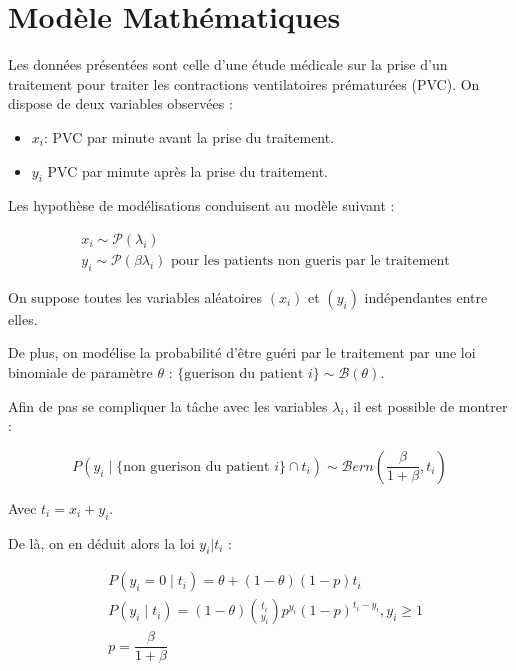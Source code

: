 \section{Modèle Mathématiques}

Les données présentées sont celle d'une étude médicale sur la prise d'un traitement pour traiter les contractions ventilatoires prématurées (PVC).
On dispose de deux variables observées : 
\begin{itemize}
    \item $x_i$: PVC par minute avant la prise du traitement.
    \item $y_i$ PVC par minute après la prise du traitement.
\end{itemize}

Les hypothèse de modélisations conduisent au modèle suivant : 

\begin{equation} \label{eq1}
\begin{split}
    & x_i \sim \mathcal P (\lambda_i) \\
    & y_i \sim \mathcal P (\beta \lambda_i) \text{ pour les patients non gueris par le traitement}
\end{split}
\end{equation}

On suppose toutes les variables aléatoires $(x_i)$ et $(y_i)$ indépendantes entre elles.

De plus, on modélise la probabilité d'être guéri par le traitement par une loi binomiale de paramètre $\theta$ : $\{\text{guerison du patient } i \} \sim \mathcal B(\theta)$.

Afin de pas se compliquer la tâche avec les variables $\lambda_i$, il est possible de montrer :

\begin{equation}
    P(y_i \mid\{\text{non guerison du patient }i\} \cap t_i) \sim \mathcal{B}ern \left (\dfrac{\beta}{1 + \beta}, t_i \right) 
\end{equation}

Avec $t_i = x_i + y_i$.

De là, on en déduit alors la loi $y_i|t_i$ :

\begin{equation} \label{eq3}
\begin{split}
&P(y_i = 0 \mid t_i)  = \theta + (1 - \theta )(1 - p) t_i \\
&P(y_i\mid t_i) = (1 - \theta) \binom{t_i}{y_i}p^{y_i}(1-p)^{t_i-y_i}, y_i \geq 1 \\
&p = \dfrac{\beta}{1 + \beta}
\end{split}
\end{equation}
 
